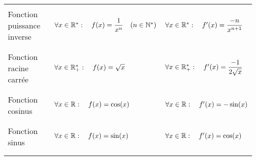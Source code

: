 \documentclass[10pt]{article}
\begin{document}
\begin{tabular}{|l|l|l|}
	                           &                                                              &                                                       \\
	\hline
	                           &                                                              &                                                       \\
	Fonction puissance inverse & $\forall x\in\mathbb{R}^*: \quad f(x)=\dfrac{1}{x^n} \quad (n\in\mathbb{N}^*)$ & $\forall x\in\mathbb{R}^* : \quad  f'(x)=\dfrac{-n}{x^{n+1}}$   \\
	                           &                                                              &                                                       \\
	\hline
	                           &                                                              &                                                       \\
	Fonction racine carrée     & $\forall x\in\mathbb{R}^*_+: \quad f(x)=\sqrt{x}$                      & $\forall x\in\mathbb{R}^*_+ : \quad  f'(x)=\dfrac{-1}{2\sqrt{x}}$ \\
	                           &                                                              &                                                       \\
	\hline
	                           &                                                              &                                                       \\
	Fonction cosinus           & $\forall x\in\mathbb{R}: \quad f(x)=\cos(x)$                         & $\forall x\in\mathbb{R} : \quad  f'(x)=-\sin(x)$              \\
	                           &                                                              &                                                       \\
	\hline
	                           &                                                              &                                                       \\
	Fonction sinus             & $\forall x\in\mathbb{R}: \quad f(x)=\sin(x)$                         & $\forall x\in\mathbb{R} : \quad  f'(x)=\cos(x)$               \\
	                           &                                                              &                                                       \\
	\hline
	                           &                                                              &                                                       \\

\end{tabular}
\end{document}
